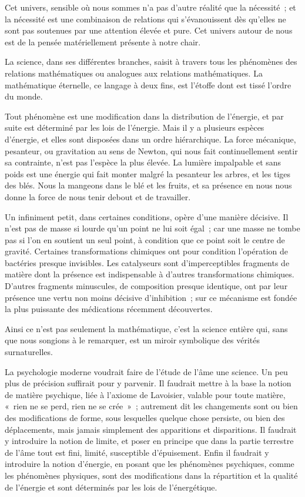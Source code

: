 \documentclass[french,twoside]{book} %
\begin{document}
Cet univers, sensible où nous sommes n'a pas d'autre réalité que la nécessité ; et la nécessité est une combinaison de relations qui s'évanouissent dès qu'elles ne sont pas soutenues par une attention élevée et pure. Cet univers autour de nous est de la pensée matériellement présente à notre chair.\par
La science, dans ses différentes branches, saisit à travers tous les phénomènes des relations mathématiques ou analogues aux relations mathématiques. La mathématique éternelle, ce langage à deux fins, est l'étoffe dont est tissé l'ordre du monde.\par
Tout phénomène est une modification dans la distribution de l'énergie, et par suite est déterminé par les lois de l'énergie. Mais il y a plusieurs espèces d'énergie, et elles sont disposées dans un ordre hiérarchique. La force mécanique, pesanteur, ou gravitation au sens de Newton, qui nous fait continuellement sentir sa contrainte, n'est pas l'espèce la plus élevée. La lumière impalpable et sans poids est une énergie qui fait monter malgré la pesanteur les arbres, et les tiges des blés. Nous la mangeons dans le blé et les fruits, et sa présence en nous nous donne la force de nous tenir debout et de travailler.\par
Un infiniment petit, dans certaines conditions, opère d'une manière décisive. Il n'est pas de masse si lourde qu'un point ne lui soit égal ; car une masse ne tombe pas si l'on en soutient un seul point, à condition que ce point soit le centre de gravité. Certaines transformations chimiques ont pour condition l'opération de bactéries presque invisibles. Les catalyseurs sont d'imperceptibles fragments de matière dont la présence est indispensable à d'autres transformations chimiques. D'autres fragments minuscules, de composition presque identique, ont par leur présence une vertu non moins décisive d'inhibition ; sur ce mécanisme est fondée la plus puissante des médications récemment découvertes.\par
Ainsi ce n'est pas seulement la mathématique, c'est la science entière qui, sans que nous songions à le remarquer, est un miroir symbolique des vérités surnaturelles.\par
La psychologie moderne voudrait faire de l'étude de l'âme une science. Un peu plus de précision suffirait pour y parvenir. Il faudrait mettre à la base la notion de matière psychique, liée à l'axiome de Lavoisier, valable pour toute matière, « rien ne se perd, rien ne se crée » ; autrement dit les changements sont ou bien des modifications de forme, sous lesquelles quelque chose persiste, ou bien des déplacements, mais jamais simplement des apparitions et disparitions. Il faudrait y introduire la notion de limite, et poser en principe que dans la partie terrestre de l'âme tout est fini, limité, susceptible d'épuisement. Enfin il faudrait y introduire la notion d'énergie, en posant que les phénomènes psychiques, comme les phénomènes physiques, sont des modifications dans la répartition et la qualité de l'énergie et sont déterminés par les lois de l'énergétique.\par
\end{document}
